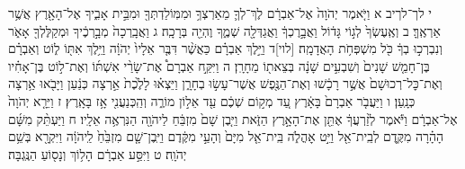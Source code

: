 \documentclass[twoside, openany, parskip=half, 11pt]{book}
\begin{document}
י לך־לךיב א וַיֹּ֤אמֶר יְהֹוָה֙ אֶל־אַבְרָ֔ם לֶךְ־לְךָ֛ מֵאַרְצְךָ֥ וּמִמּֽוֹלַדְתְּךָ֖ וּמִבֵּ֣ית אָבִ֑יךָ אֶל־הָאָ֖רֶץ אֲשֶׁ֥ר אַרְאֶֽךָּ׃ ב וְאֶֽעֶשְׂךָ֙ לְג֣וֹי גָּד֔וֹל וַאֲבָ֣רֶכְךָ֔ וַאֲגַדְּלָ֖ה שְׁמֶ֑ךָ וֶהְיֵ֖ה בְּרָכָֽה׃ ג וַאֲבָֽרְכָה֙ מְבָ֣רְכֶ֔יךָ וּמְקַלֶּלְךָ֖ אָאֹ֑ר וְנִבְרְכ֣וּ בְךָ֔ כֹּ֖ל מִשְׁפְּחֹ֥ת הָאֲדָמָֽה׃ [לוי]ד וַיֵּ֣לֶךְ אַבְרָ֗ם כַּאֲשֶׁ֨ר דִּבֶּ֤ר אֵלָיו֙ יְהֹוָ֔ה וַיֵּ֥לֶךְ אִתּ֖וֹ ל֑וֹט וְאַבְרָ֗ם בֶּן־חָמֵ֤שׁ שָׁנִים֙ וְשִׁבְעִ֣ים שָׁנָ֔ה בְּצֵאת֖וֹ מֵחָרָֽן׃ ה וַיִּקַּ֣ח אַבְרָם֩ אֶת־שָׂרַ֨י אִשְׁתּ֜וֹ וְאֶת־ל֣וֹט בֶּן־אָחִ֗יו וְאֶת־כׇּל־רְכוּשָׁם֙ אֲשֶׁ֣ר רָכָ֔שׁוּ וְאֶת־הַנֶּ֖פֶשׁ אֲשֶׁר־עָשׂ֣וּ בְחָרָ֑ן וַיֵּצְא֗וּ לָלֶ֙כֶת֙ אַ֣רְצָה כְּנַ֔עַן וַיָּבֹ֖אוּ אַ֥רְצָה כְּנָֽעַן׃ ו וַיַּעֲבֹ֤ר אַבְרָם֙ בָּאָ֔רֶץ עַ֚ד מְק֣וֹם שְׁכֶ֔ם עַ֖ד אֵל֣וֹן מוֹרֶ֑ה וְהַֽכְּנַעֲנִ֖י אָ֥ז בָּאָֽרֶץ׃ ז וַיֵּרָ֤א יְהֹוָה֙ אֶל־אַבְרָ֔ם וַיֹּ֕אמֶר לְזַ֨רְעֲךָ֔ אֶתֵּ֖ן אֶת־הָאָ֣רֶץ הַזֹּ֑את וַיִּ֤בֶן שָׁם֙ מִזְבֵּ֔חַ לַיהֹוָ֖ה הַנִּרְאֶ֥ה אֵלָֽיו׃ ח וַיַּעְתֵּ֨ק מִשָּׁ֜ם הָהָ֗רָה מִקֶּ֛דֶם לְבֵֽית־אֵ֖ל וַיֵּ֣ט אׇהֳלֹ֑ה בֵּֽית־אֵ֤ל מִיָּם֙ וְהָעַ֣י מִקֶּ֔דֶם וַיִּֽבֶן־שָׁ֤ם מִזְבֵּ֙חַ֙ לַֽיהֹוָ֔ה וַיִּקְרָ֖א בְּשֵׁ֥ם יְהֹוָֽה׃ ט וַיִּסַּ֣ע אַבְרָ֔ם הָל֥וֹךְ וְנָס֖וֹעַ הַנֶּֽגְבָּה׃
\end{document}
